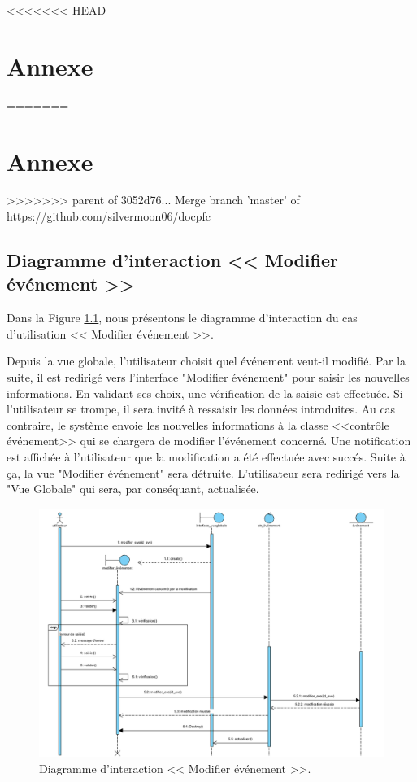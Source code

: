 
\appendix
<<<<<<< HEAD
\chapter{Annexe}
=======
\chapter*{Annexe}
>>>>>>> parent of 3052d76... Merge branch 'master' of https://github.com/silvermoon06/docpfc
\renewcommand{\headrulewidth}{1pt}




\section{Diagramme d'interaction << Modifier \'ev\'enement >>}

Dans la Figure \ref{modifierevent}, nous pr\'esentons le diagramme d'interaction du cas d'utilisation << Modifier \'ev\'enement >>. 

Depuis la vue globale, l'utilisateur choisit quel \'ev\'enement veut-il modifi\'e. Par la suite, il est redirig\'e vers l'interface "Modifier \'ev\'enement" pour saisir les nouvelles informations. En validant ses choix, une v\'erification de la saisie est effectu\'ee. Si l'utilisateur se trompe, il sera invit\'e \`a ressaisir les donn\'ees introduites. Au cas contraire, le syst\`eme envoie les nouvelles informations \`a la classe <<contr\^ole \'ev\'enement>> qui se chargera de modifier l'\'ev\'enement concern\'e. Une notification est affich\'ee \`a l'utilisateur que la modification a \'et\'e effectu\'ee avec succ\'es. Suite \`a \c{c}a, la vue "Modifier \'ev\'enement" sera d\'etruite. L'utilisateur sera redirig\'e vers la "Vue Globale" qui sera, par cons\'equant, actualis\'ee.  
\begin{landscape}
\begin{figure}[H]
	\centering
		\includegraphics[width=21cm]{images/modifier_event.PNG}
	\caption{Diagramme d'interaction << Modifier \'ev\'enement >>.}
	\label{modifierevent}
\end{figure}
\end{landscape}

